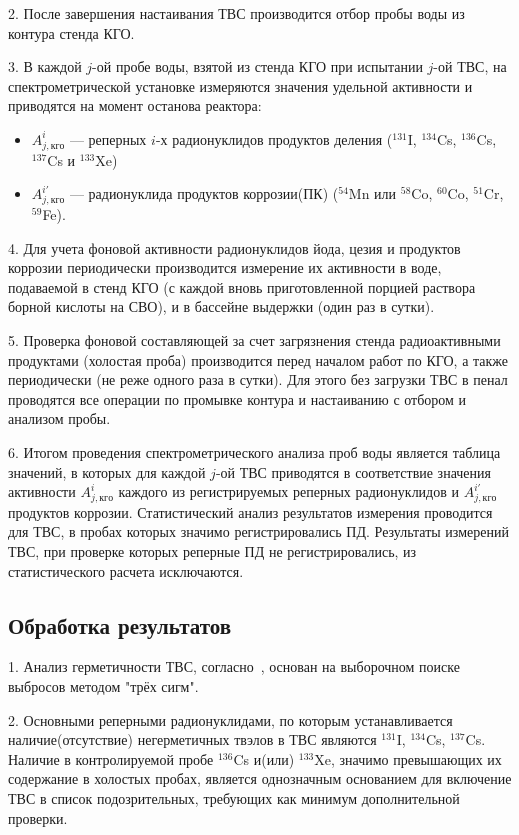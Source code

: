 2. После завершения настаивания ТВС производится отбор пробы воды из контура стенда КГО.

3. В каждой $j$-ой пробе воды, взятой из стенда КГО при испытании $j$-ой ТВС, на спектрометрической установке измеряются значения удельной активности и приводятся на момент останова реактора:
\begin{itemize}
\item $A_{j,кго}^{i}$ --- реперных $i$-х радионуклидов продуктов деления ($^{131}$I, $^{134}$Cs, $^{136}$Cs, $^{137}$Cs и $^{133}$Xe)

\item $A_{j,кго}^{i'}$ --- радионуклида продуктов коррозии(ПК) ($^{54}$Mn или $^{58}$Co, $^{60}$Co, $^{51}$Cr, $^{59}$Fe).
\end{itemize}

4. Для учета фоновой активности радионуклидов йода, цезия и
продуктов коррозии периодически производится измерение их активности
в воде, подаваемой в стенд КГО (с каждой вновь приготовленной порцией
раствора борной кислоты на СВО), и в бассейне выдержки (один раз в
сутки).

5. Проверка фоновой составляющей за счет загрязнения стенда
радиоактивными продуктами (холостая проба) производится перед началом
работ по КГО, а также периодически (не реже одного раза в сутки). Для этого
без загрузки ТВС в пенал проводятся все операции по промывке контура и
настаиванию с отбором и анализом пробы.

6. Итогом проведения спектрометрического анализа проб воды является
таблица значений, в которых для каждой $j$-ой ТВС приводятся в соответствие
значения активности $A_{j,кго}^{i}$ каждого из регистрируемых реперных радионуклидов
и $A_{j,кго}^{i'}$ продуктов коррозии. Статистический анализ результатов
измерения проводится для ТВС, в пробах которых значимо регистрировались
ПД. Результаты измерений ТВС, при проверке которых реперные ПД не
регистрировались, из статистического расчета исключаются.

\subsection{Обработка результатов}
1. Анализ герметичности ТВС, согласно~\cite{RD}, основан на выборочном поиске выбросов методом "трёх сигм".

2. Основными реперными радионуклидами, по которым устанавливается наличие(отсутствие) негерметичных твэлов в ТВС являются $^{131}$I, $^{134}$Cs, $^{137}$Cs. Наличие в контролируемой пробе $^{136}$Cs и(или) $^{133}$Xe, значимо превышающих их содержание в холостых пробах, является однозначным основанием для включение ТВС в список подозрительных, требующих как минимум дополнительной проверки.

